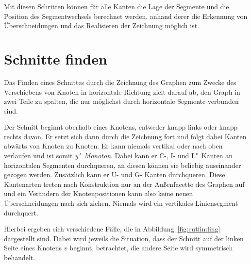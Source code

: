 \documentclass[a4paper]{scrreprt}
\theoremstyle{definition}
\begin{document}
Mit diesen Schritten können für alle Kanten die Lage der Segmente und die Position des Segmentwechsels berechnet werden, anhand derer die Erkennung von Überschneidungen und das Realisieren der Zeichnung möglich ist.

\section{Schnitte finden}
\label{sec:cutfinding}

Das Finden eines Schnittes durch die Zeichnung des Graphen zum Zwecke des Verschiebens von Knoten in horizontale Richtung zielt darauf ab, den Graph in zwei Teile zu spalten, die nur möglichst durch horizontale Segmente verbunden sind. 

Der Schnitt beginnt oberhalb eines Knotens, entweder knapp links oder knapp rechts davon. Er setzt sich dann durch die Zeichnung fort und folgt dabei Kanten abwärts von Knoten zu Knoten. Er kann niemals vertikal oder nach oben verlaufen und ist somit \emph{y"~Monoton}. Dabei kann er C-, I- und L"~Kanten an horizontalen Segmenten durchqueren, an diesen können sie beliebig auseinander gezogen werden. Zusätzlich kann er U- und G- Kanten durchqueren. Diese Kantenarten treten nach Konstruktion nur an der Außenfacette des Graphen auf und ein Verändern der Knotenpositionen kann also keine neuen Überschneidungen nach sich ziehen. Niemals wird ein vertikales Liniensegment durchquert.

Hierbei ergeben sich verschiedene Fälle, die in Abbildung~\ref{fig:cutfinding} dargestellt sind. Dabei wird jeweils die Situation, dass der Schnitt auf der linken Seite eines Knotens $v$ beginnt, betrachtet, die andere Seite wird symmetrisch behandelt. 
\end{document}
